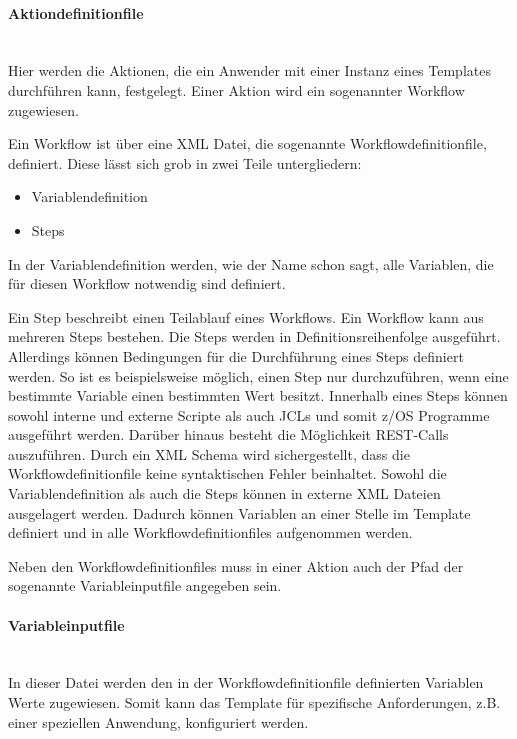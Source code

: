 \paragraph{\glqq Aktiondefinitionfile\grqq} ~\\
Hier werden die Aktionen, die ein Anwender mit einer Instanz eines Templates durchführen kann, festgelegt.
Einer Aktion wird ein sogenannter \glqq Workflow\grqq{} zugewiesen.

Ein Workflow ist über eine XML Datei, die sogenannte \glqq Workflowdefinitionfile\grqq, definiert.
Diese lässt sich grob in zwei Teile untergliedern:
\begin{itemize}
\item Variablendefinition
\item Steps
\end{itemize}
In der Variablendefinition werden, wie der Name schon sagt, alle Variablen, die für diesen Workflow notwendig sind definiert.

Ein Step beschreibt einen Teilablauf eines Workflows.
Ein Workflow kann aus mehreren Steps bestehen.
Die Steps werden in Definitionsreihenfolge ausgeführt.
Allerdings können Bedingungen für die Durchführung eines Steps definiert werden.
So ist es beispielsweise möglich, einen Step nur durchzuführen, wenn eine bestimmte Variable einen bestimmten Wert besitzt.
Innerhalb eines Steps können sowohl interne und externe Scripte als auch JCLs und somit z/OS Programme ausgeführt werden.
Darüber hinaus besteht die Möglichkeit REST-Calls auszuführen.
Durch ein XML Schema wird sichergestellt, dass die Workflowdefinitionfile keine syntaktischen Fehler beinhaltet.
Sowohl die Variablendefinition als auch die Steps können in externe XML Dateien ausgelagert werden.
Dadurch können Variablen an einer Stelle im Template definiert und in alle Workflowdefinitionfiles aufgenommen werden.
\cite{Rotthove.2018}

Neben den Workflowdefinitionfiles muss in einer Aktion auch der Pfad der sogenannte \glqq Variableinputfile\grqq{} angegeben sein.

\paragraph{\glqq Variableinputfile\grqq}\label{par:variable} ~\\
In dieser Datei werden den in der Workflowdefinitionfile definierten Variablen Werte zugewiesen.
Somit kann das Template für spezifische Anforderungen, z.B. einer speziellen Anwendung,  konfiguriert werden.

